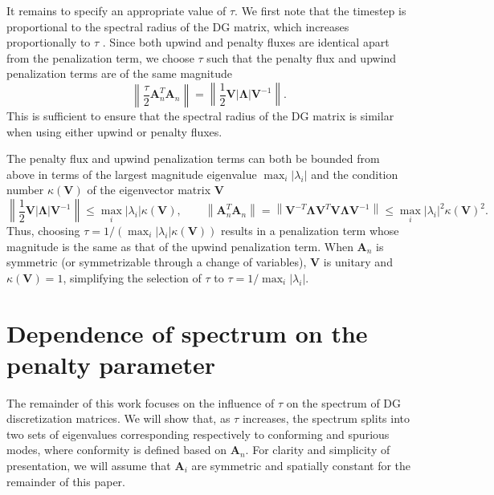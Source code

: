 \documentclass[preprint,10pt]{elsarticle}
\newcommand{\nor}[1]{\left\| #1 \right\|}
\newcommand{\LRp}[1]{\left( #1 \right)}
\newcommand{\LRb}[1]{\left| #1 \right|}
\newcommand{\note}[1]{#1}
\begin{document}
\note{It remains to specify an appropriate value of $\tau$.  We first note that the timestep is proportional to the spectral radius of the DG matrix, which increases proportionally to $\tau$ \cite{chan2015gpu}.  Since both upwind and penalty fluxes are identical apart from the penalization term, we choose $\tau$ such that the penalty flux and upwind penalization terms are of the same magnitude 
\[
\nor{\frac{\tau}{2} \bm{A}_n^T\bm{A}_n} = \nor{\frac{1}{2}\bm{V}\LRb{\bm{\Lambda}}{\bm{V}^{-1}}}.
\]
This is sufficient to ensure that the spectral radius of the DG matrix is similar when using either upwind or penalty fluxes.  

The penalty flux and upwind penalization terms can both be bounded from above in terms of the largest magnitude eigenvalue $\max_i\LRb{\lambda_i}$ and the condition number $\kappa\LRp{\bm{V}}$ of the eigenvector matrix $\bm{V}$
\[
\nor{\frac{1}{2}\bm{V}\LRb{\bm{\Lambda}}{\bm{V}^{-1}}} \leq \max_i \LRb{\lambda_i} \kappa\LRp{\bm{V}}, \qquad \nor{\bm{A}_n^T\bm{A}_n} = \nor{\bm{V}^{-T}\bm{\Lambda}\bm{V}^T \bm{V}\bm{\Lambda}\bm{V}^{-1}} \leq \max_i\LRb{\lambda_i}^2\kappa\LRp{\bm{V}}^2.
\]
Thus, choosing $\tau = 1/\LRp{\max_i\LRb{\lambda_i}\kappa\LRp{\bm{V}}}$ results in a penalization term whose magnitude is the same as that of the upwind penalization term.  When $\bm{A}_n$ is symmetric (or symmetrizable through a change of variables), $\bm{V}$ is unitary and $\kappa\LRp{\bm{V}} = 1$, simplifying the selection of $\tau$ to $\tau = 1/\max_i\LRb{\lambda_i}$.  
}


\section{Dependence of \note{spectrum} on the penalty parameter}
\label{sec:spec}
The remainder of this work focuses on the influence of $\tau$ on the \note{spectrum} of DG discretization matrices.  We will show that, as $\tau$ increases, the \note{spectrum} splits into two sets of eigenvalues corresponding respectively to conforming and spurious modes, where conformity is defined based on $\bm{A}_n$.  \note{For clarity and simplicity of presentation, we will assume that $\bm{A}_i$ are symmetric and spatially constant for the remainder of this paper.  }%
\end{document}
